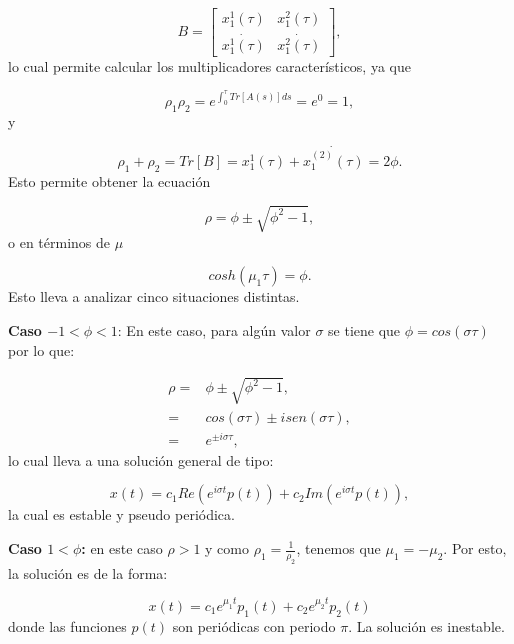 \documentclass[10pt,a4paper]{report}
\begin{document}
\begin{equation}
B= [\begin{array}{cc}

x_1^1(\tau) & x_1^2(\tau) \\
\dot{x_1^1(\tau)} & \dot{x_1^2(\tau)}

\end{array}],
\end{equation} lo cual permite calcular los multiplicadores característicos, ya que

\begin{equation}
\rho_1 \rho_2 = e^{\int_0^\tau Tr[A(s)]ds} = e^0 = 1,
\end{equation} y

\begin{equation}
\rho_1 + \rho_2 = Tr[B] =x_1^1(\tau)+ \dot{x_1^{(2)}(\tau)} = 2\phi.
\end{equation} Esto permite obtener la ecuación

\begin{equation}
\rho = \phi \pm \sqrt{\phi^2 -1},
\end{equation} o en términos de $\mu$

\begin{equation}
cosh(\mu_1 \tau) = \phi.
\end{equation} Esto lleva a analizar cinco situaciones distintas.

\textbf{Caso $ -1 < \phi < 1$}: En este caso, para algún valor $\sigma$ se tiene que $\phi = cos(\sigma \tau)$ por lo que:

\begin{align*}
\rho =& \phi \pm \sqrt{\phi^2 -1},\\
=& cos(\sigma \tau) \pm isen(\sigma \tau), \\
=& e^{\pm i\sigma \tau},
\end{align*} lo cual lleva a una solución general de tipo:

\begin{equation}
x(t) = c_1 Re(e^{i\sigma t} p(t)) + c_2 Im(e^{i\sigma t} p(t)),
\end{equation} la cual es estable y pseudo periódica.

\textbf{Caso $1 < \phi$:} en este caso $\rho > 1$ y como $\rho_1 = \frac{1}{\rho_2}$, tenemos que $\mu_1 = -\mu_2$. Por esto, la solución es de la forma:

\begin{equation}
x(t) = c_1 e^{\mu_1 t}p_1(t) + c_2 e^{\mu_2 t}p_2(t)
\end{equation} donde las funciones $p(t)$ son periódicas con periodo $\pi$. La solución es inestable.
\end{document}

